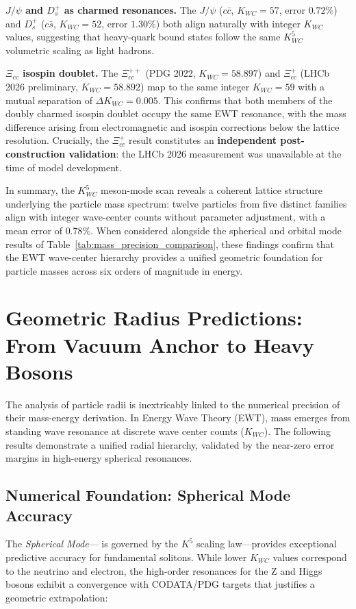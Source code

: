 \documentclass[10pt,a4paper]{article}
\begin{document}
\textbf{$J/\psi$ and $D_s^+$ as charmed resonances.} The $J/\psi$ ($c\bar{c}$, $K_{WC}=57$, error $0.72\%$) and $D_s^+$ ($c\bar{s}$, $K_{WC}=52$, error $1.30\%$) both align naturally with integer $K_{WC}$ values, suggesting that heavy-quark bound states follow the same $K_{WC}^5$ volumetric scaling as light hadrons. 

\textbf{$\Xi_{cc}$ isospin doublet.} The $\Xi_{cc}^{++}$ (PDG 2022, $K_{WC}=58.897$) and $\Xi_{cc}^{+}$ (LHCb 2026 preliminary, $K_{WC}=58.892$) map to the same integer $K_{WC}=59$ with a mutual separation of $\Delta K_{WC} = 0.005$. This confirms that both members of the doubly charmed isospin doublet occupy the same EWT resonance, with the mass difference arising from electromagnetic and isospin corrections below the lattice resolution. Crucially, the $\Xi_{cc}^{+}$ result constitutes an \textbf{independent post-construction validation}: the LHCb 2026 \cite{LHCb2026} measurement was unavailable at the time of model development.

In summary, the $K_{WC}^5$ meson-mode scan reveals a coherent lattice structure underlying the particle mass spectrum: twelve particles from five distinct families align with integer wave-center counts without parameter adjustment, with a mean error of $0.78\%$. When considered alongside the spherical and orbital mode results of Table~\ref{tab:mass_precision_comparison}, these findings confirm that the EWT wave-center hierarchy provides a unified geometric foundation for particle masses across six orders of magnitude in energy.


\section{Geometric Radius Predictions: From Vacuum Anchor to Heavy Bosons}
\label{sec:radius_predictions}

The analysis of particle radii is inextricably linked to the numerical precision of their mass-energy derivation. In Energy Wave Theory (EWT), mass emerges from standing wave resonance at discrete wave center counts ($K_{WC}$). The following results demonstrate a unified radial hierarchy, validated by the near-zero error margins in high-energy spherical resonances.

\subsection{Numerical Foundation: Spherical Mode Accuracy}
The \textit{Spherical Mode}— is governed by the $K^5$ scaling law—provides exceptional predictive accuracy for fundamental solitons. While lower $K_{WC}$ values correspond to the neutrino and electron, the high-order resonances for the Z and Higgs bosons exhibit a convergence with CODATA/PDG targets that justifies a geometric extrapolation:
\end{document}
